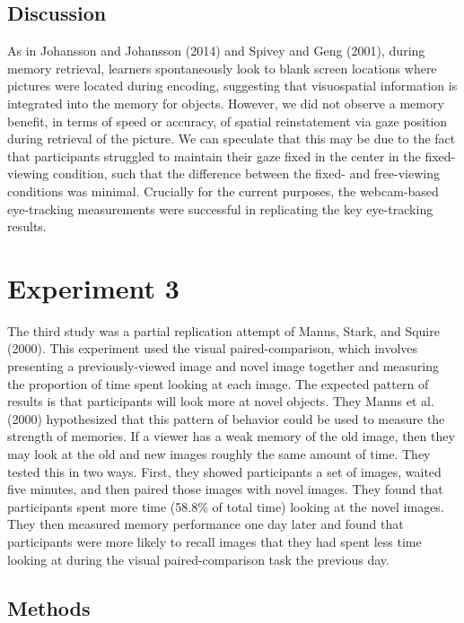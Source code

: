 \documentclass[
  man,floatsintext]{apa6}
\begin{document}
\hypertarget{discussion-1}{%
\subsection{Discussion}\label{discussion-1}}

As in Johansson and Johansson (2014) and Spivey and Geng (2001), during memory retrieval, learners spontaneously look to blank screen locations where pictures were located
during encoding, suggesting that visuospatial information is integrated into the memory
for objects. However, we did not observe a memory benefit, in terms of speed or accuracy, of spatial reinstatement via gaze position during retrieval of the picture. We can speculate that this may be due to the fact that participants struggled to maintain their gaze fixed in the center in the fixed-viewing condition, such that the difference between the fixed- and free-viewing conditions was minimal. Crucially for the current purposes, the webcam-based eye-tracking measurements were successful in replicating the key eye-tracking results.

\hypertarget{experiment-3}{%
\section{Experiment 3}\label{experiment-3}}

The third study was a partial replication attempt of
Manns, Stark, and Squire (2000). This experiment used the visual
paired-comparison, which involves presenting a previously-viewed image
and novel image together and measuring the proportion of time spent
looking at each image. The expected pattern of results is that
participants will look more at novel objects. They
Manns et al. (2000) hypothesized that this pattern of
behavior could be used to measure the strength of memories. If a viewer
has a weak memory of the old image, then they may look at the old and
new images roughly the same amount of time. They tested this in two
ways. First, they showed participants a set of images, waited five
minutes, and then paired those images with novel images. They found that
participants spent more time (58.8\% of total time) looking at the novel
images. They then measured memory performance one day later and found
that participants were more likely to recall images that they had spent
less time looking at during the visual paired-comparison task the
previous day.

\hypertarget{methods-2}{%
\subsection{Methods}\label{methods-2}}
\end{document}
